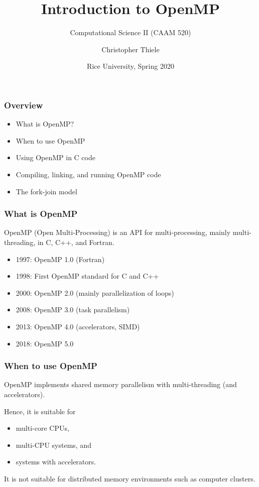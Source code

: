 \documentclass[12pt,t]{beamer}
\begin{document}
  \title{Introduction to OpenMP}
  \subtitle{Computational Science II (CAAM 520)}
  \author{Christopher Thiele}
  \date{Rice University, Spring 2020}

  \begin{frame}
    \titlepage
  \end{frame}


  \begin{frame}[fragile]
    \frametitle{Overview}

    \begin{itemize}
      \item What is OpenMP?
      \item When to use OpenMP
      \item Using OpenMP in C code
      \item Compiling, linking, and running OpenMP code
      \item The fork-join model
    \end{itemize}
  \end{frame}

  \begin{frame}[fragile]
    \frametitle{What is OpenMP}

    OpenMP (Open Multi-Processing) is an API for multi-processing, mainly multi-threading, in C, C++, and Fortran.

    \begin{itemize}
      \item 1997: OpenMP 1.0 (Fortran)
      \item 1998: First OpenMP standard for C and C++
      \item 2000: OpenMP 2.0 (mainly parallelization of loops)
      \item 2008: OpenMP 3.0 (task parallelism)
      \item 2013: OpenMP 4.0 (accelerators, SIMD)
      \item 2018: OpenMP 5.0
    \end{itemize}
  \end{frame}

  \begin{frame}[fragile]
    \frametitle{When to use OpenMP}

    OpenMP implements shared memory parallelism with multi-threading (and accelerators).

    Hence, it is suitable for
    \begin{itemize}
      \item multi-core CPUs,
      \item multi-CPU systems, and
      \item systems with accelerators.
    \end{itemize}

    It is not suitable for distributed memory environments such as computer clusters.
  \end{frame}
\end{document}
